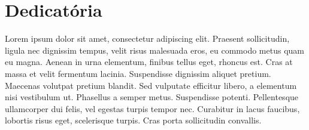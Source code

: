 \section{Dedicatória}
\label{sec:dedicatoria}

Lorem ipsum dolor sit amet, consectetur adipiscing elit. Praesent sollicitudin, ligula nec dignissim tempus, velit risus malesuada eros, eu commodo metus quam eu magna. Aenean in urna elementum, finibus tellus eget, rhoncus est. Cras at massa et velit fermentum lacinia. Suspendisse dignissim aliquet pretium. Maecenas volutpat pretium blandit. Sed vulputate efficitur libero, a elementum nisi vestibulum ut. Phasellus a semper metus. Suspendisse potenti. Pellentesque ullamcorper dui felis, vel egestas turpis tempor nec. Curabitur in lacus faucibus, lobortis risus eget, scelerisque turpis. Cras porta sollicitudin convallis.
